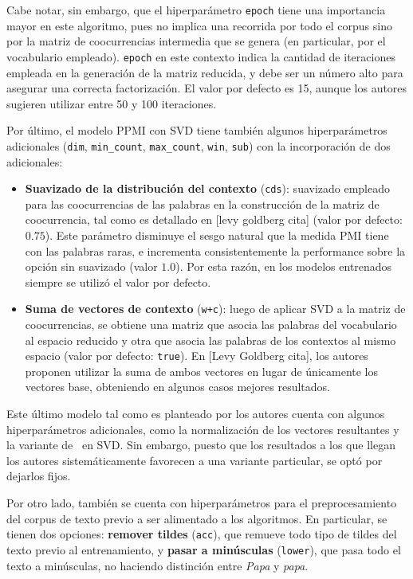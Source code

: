 Cabe notar, sin embargo, que el hiperparámetro \texttt{epoch} tiene una importancia mayor en este
algoritmo, pues no implica una recorrida por todo el corpus sino por la matriz de coocurrencias
intermedia que se genera (en particular, por el vocabulario empleado). \texttt{epoch} en este
contexto indica la cantidad de iteraciones empleada en la generación de la matriz reducida, y debe
ser un número alto para asegurar una correcta factorización. El valor por defecto es 15, aunque los
autores sugieren utilizar entre 50 y 100 iteraciones.

Por último, el modelo PPMI con SVD tiene también algunos hiperparámetros adicionales (\texttt{dim},
\texttt{min\_count}, \texttt{max\_count}, \texttt{win}, \texttt{sub}) con la incorporación de dos
adicionales:

\begin{itemize}

\item \textbf{Suavizado de la distribución del contexto} (\texttt{cds}): suavizado empleado para las
coocurrencias de las palabras en la construcción de la matriz de coocurrencia, tal como es detallado
en [levy goldberg cita] (valor por defecto: $0.75$). Este parámetro disminuye el sesgo natural que
la medida PMI tiene con las palabras raras, e incrementa consistentemente la performance sobre la
opción sin suavizado (valor $1.0$). Por esta razón, en los modelos entrenados siempre se utilizó el
valor por defecto.

\item \textbf{Suma de vectores de contexto} (\texttt{w+c}): luego de aplicar SVD a la matriz de
coocurrencias, se obtiene una matriz que asocia las palabras del vocabulario al espacio reducido y
otra que asocia las palabras de los contextos al mismo espacio (valor por defecto:
\texttt{true}). En [Levy Goldberg cita], los autores proponen utilizar la suma de ambos vectores en
lugar de únicamente los vectores base, obteniendo en algunos casos mejores resultados.

\end{itemize}

Este último modelo tal como es planteado por los autores cuenta con algunos hiperparámetros
adicionales, como la normalización de los vectores resultantes y la variante de~\cite{Caron2001} en
SVD\@. Sin embargo, puesto que los resultados a los que llegan los autores sistemáticamente
favorecen a una variante particular, se optó por dejarlos fijos.


Por otro lado, también se cuenta con hiperparámetros para el preprocesamiento del corpus de texto
previo a ser alimentado a los algoritmos. En particular, se tienen dos opciones: \textbf{remover
tildes} (\texttt{acc}), que remueve todo tipo de tildes del texto previo al entrenamiento, y
\textbf{pasar a minúsculas} (\texttt{lower}), que pasa todo el texto a minúsculas, no haciendo
distinción entre \textit{Papa} y \textit{papa}.

